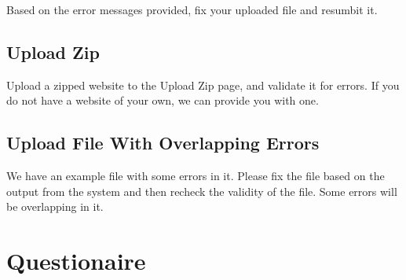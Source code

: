 \documentclass[11pt]{article}
\begin{document}
Based on the error messages provided, fix your uploaded file and resumbit it.

\subsection*{Upload Zip}

Upload a zipped website to the Upload Zip page, and validate it for errors. If you do not have a website of your own, we can provide you with one.

\subsection*{Upload File With Overlapping Errors}

We have an example file with some errors in it. Please fix the file based on the output from the system and then recheck the validity of the file. Some errors will be overlapping in it.

\section*{Questionaire}
\end{document}
